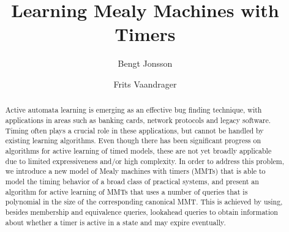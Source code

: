\documentclass{llncs}
\begin{document}
\title{Learning Mealy Machines with Timers}
\author{
Bengt Jonsson 
\and
Frits Vaandrager 
}

\maketitle

\begin{abstract}
Active automata learning is emerging as an effective bug finding technique, with applications in areas such as banking cards, network protocols and legacy software. Timing often plays a crucial role in these applications, but cannot be handled by existing learning algorithms. Even though there has been significant progress on algorithms for active learning of timed models, these are not yet broadly applicable due to limited expressiveness and/or high complexity.
In order to address this problem, we introduce a new model of Mealy machines with timers (MMTs) that is able to model the timing behavior of a broad class of practical systems, and present an algorithm for active learning of MMTs that uses a
number of queries that is polynomial in the size of the corresponding canonical MMT. This is achieved by using, besides membership and equivalence queries, 
lookahead queries to obtain information about whether a timer is active in a state and may expire eventually.
\end{abstract}




%

%




\end{document}

